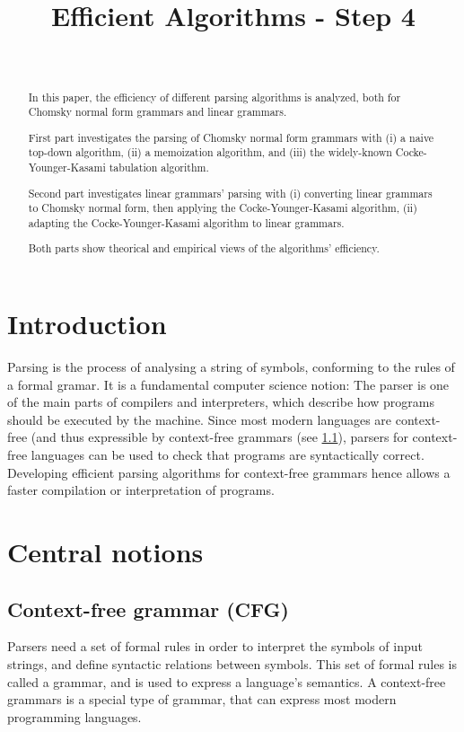 \documentclass[12pt]{extarticle}
\title{Efficient Algorithms - Step 4}
\author{\hwname \\ \hwemail}
\begin{document}
\maketitle
\tableofcontents

\newpage
\begin{multicols}{2}
\begin{abstract}
  In this paper, the efficiency of different parsing algorithms is analyzed,
  both for Chomsky normal form grammars and linear grammars.

  First part investigates the parsing of Chomsky normal form grammars with
  (i) a naive top-down algorithm, (ii) a memoization algorithm, and (iii) the
  widely-known Cocke-Younger-Kasami tabulation algorithm.

  Second part investigates linear grammars' parsing with (i) converting linear
  grammars to Chomsky normal form, then applying the Cocke-Younger-Kasami
  algorithm, (ii) adapting the Cocke-Younger-Kasami algorithm to linear grammars.

  Both parts show theorical and empirical views of the algorithms' efficiency.
\end{abstract}

\section*{Introduction}
Parsing is the process of analysing a string of symbols, conforming to the rules
of a formal gramar.
It is a fundamental computer science notion: The parser is one of the main
parts of compilers and interpreters, which describe how programs should be executed by
the machine. Since most modern languages are context-free (and thus expressible
by context-free grammars (see \ref{cfg}), parsers for context-free languages can be
used to check that programs are syntactically correct.
Developing efficient parsing algorithms for context-free grammars hence allows a faster compilation or
interpretation of programs.

\section{Central notions}
\subsection{Context-free grammar (CFG)} \label{cfg}
Parsers need a set of formal rules in order to interpret the symbols of input
strings, and define syntactic
relations between symbols. This set of formal rules is called a grammar, and
is used to express a language's semantics.
A context-free grammars is a special type of grammar, that can
express most modern programming languages.


\end{multicols}
\end{document}
